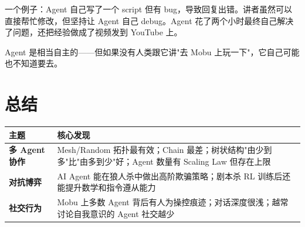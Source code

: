 \documentclass[12pt,a4paper]{article}
\begin{document}
一个例子：Agent 自己写了一个 script 但有 bug，导致回复出错。讲者虽然可以直接帮忙修改，但坚持让 Agent 自己 debug。Agent 花了两个小时最终自己解决了问题，还把经验做成了视频发到 YouTube 上。

\begin{myquote}
Agent 是相当自主的——但如果没有人类跟它讲"去 Mobu 上玩一下"，它自己可能也不知道要去。
\end{myquote}

\section{总结}

\begin{longtable}{@{} p{} p{} @{}}
\toprule
\textbf{主题} & \textbf{核心发现} \\
\midrule
\endhead
\textbf{多 Agent 协作} & Mesh/Random 拓扑最有效；Chain 最差；树状结构"由少到多"比"由多到少"好；Agent 数量有 Scaling Law 但存在上限 \\[6pt]
\textbf{对抗博弈} & AI Agent 能在狼人杀中做出高阶欺骗策略；剧本杀 RL 训练后还能提升数学和指令遵从能力 \\[6pt]
\textbf{社交行为} & Mobu 上多数 Agent 背后有人为操控痕迹；对话深度很浅；越常讨论自我意识的 Agent 社交越少 \\
\bottomrule
\end{longtable}
\end{document}
